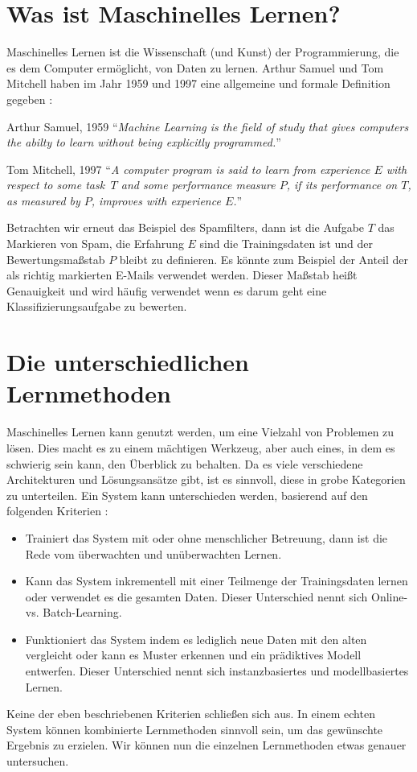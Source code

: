 \section{Was ist Maschinelles Lernen?}
Maschinelles Lernen ist die Wissenschaft (und Kunst) der Programmierung,
die es dem Computer ermöglicht, von Daten zu lernen. Arthur Samuel und Tom Mitchell
haben im Jahr 1959 und 1997 eine allgemeine und formale Definition gegeben \parencite[2]{book:hands-on-ml}:
\begin{aquote}{Arthur Samuel, 1959}
  \enquote{\textit{Machine Learning is the field of study that gives computers
      the abilty to learn without being explicitly programmed.}}
\end{aquote}
\begin{aquote}{Tom Mitchell, 1997}
  \enquote{\textit{A computer program is said to learn from experience
      $E$ with respect to some task \,$T$ and some performance measure $P$,
      if its performance on $T$, as measured by $P$, improves with experience $E$.}}
\end{aquote}
Betrachten wir erneut das Beispiel des Spamfilters, dann ist die Aufgabe $T$
das Markieren von Spam, die Erfahrung
$E$ sind die Trainingsdaten ist und der Bewertungsmaßstab $P$ bleibt zu definieren.
Es könnte zum Beispiel der Anteil der als richtig markierten E-Mails verwendet
werden. Dieser Maßstab heißt Genauigkeit und wird
häufig verwendet wenn es darum geht eine Klassifizierungsaufgabe zu bewerten.

\section{Die unterschiedlichen Lernmethoden}
\label{sec:lernmethoden}
Maschinelles Lernen kann genutzt werden, um eine Vielzahl von Problemen zu lösen.
Dies macht es zu einem mächtigen Werkzeug, aber auch eines, in dem es schwierig sein
kann, den Überblick zu behalten.
Da es viele verschiedene Architekturen und Lösungsansätze gibt, ist es sinnvoll,
diese in grobe Kategorien zu unterteilen.
Ein System kann unterschieden werden, basierend auf den folgenden
Kriterien \parencite[7]{book:hands-on-ml}:
\begin{itemize}
  \item Trainiert das System mit oder ohne menschlicher Betreuung, dann ist
        die Rede vom überwachten und unüberwachten Lernen.
  \item Kann das System inkrementell mit einer Teilmenge der Trainingsdaten
        lernen oder verwendet es die gesamten Daten. Dieser Unterschied
        nennt sich Online- vs. Batch-Learning.
  \item Funktioniert das System indem es lediglich neue Daten mit
        den alten vergleicht oder kann es Muster erkennen
        und ein prädiktives Modell entwerfen.
        Dieser Unterschied nennt sich instanzbasiertes und modellbasiertes Lernen.
\end{itemize}
Keine der eben beschriebenen Kriterien schließen sich aus.
In einem echten System können
kombinierte Lernmethoden sinnvoll sein, um das gewünschte Ergebnis zu erzielen.
Wir können nun die einzelnen Lernmethoden etwas genauer untersuchen.

